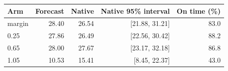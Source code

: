 \begin{tabular}{lrrrr}
\toprule
Arm & Forecast & Native & Native 95\% interval & On time (\%) \\
\midrule
margin & 28.40 & 26.54 & [21.88, 31.21] & 83.0 \\
0.25 & 27.86 & 26.49 & [22.56, 30.42] & 88.2 \\
0.65 & 28.00 & 27.67 & [23.17, 32.18] & 86.8 \\
1.05 & 10.53 & 15.41 & [8.45, 22.37] & 43.0 \\
\bottomrule
\end{tabular}
